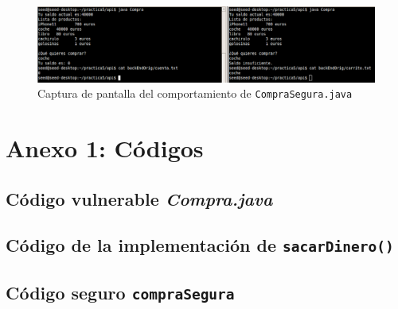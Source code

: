 \documentclass{article}
\begin{document}
\begin{figure}[h!]
    \centering
    \includegraphics[scale=0.56]{images/p3.png}
    \caption{Captura de pantalla del comportamiento de \texttt{CompraSegura.java}}
    \label{fig:comportamientoCompraSegura}
\end{figure}


\newpage
\section{Anexo 1: Códigos}

\subsection{Código vulnerable \textit{Compra.java}}


\subsection{Código de la implementación de \texttt{sacarDinero()}}


\newpage
\subsection{Código seguro \texttt{compraSegura}}

\end{document}
